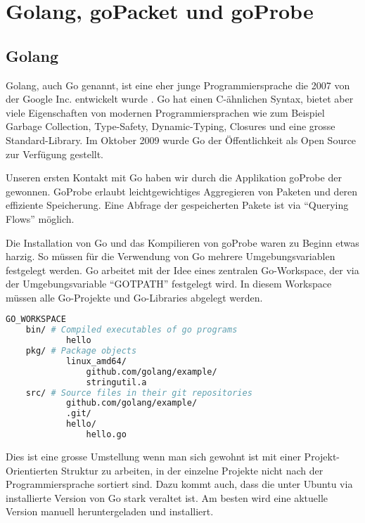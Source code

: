 \section{Golang, goPacket und goProbe}
\label{sec:Golang, goPacket und goProbe}

\subsection{Golang}
Golang, auch Go genannt, ist eine eher junge Programmiersprache die 2007 von der Google Inc. entwickelt wurde \cite[:10]{techcrunch_golang}. Go hat einen C-ähnlichen Syntax, bietet aber viele Eigenschaften von modernen Programmiersprachen wie zum Beispiel Garbage Collection, Type-Safety, Dynamic-Typing, Closures und eine grosse Standard-Library.\cite[:1-30]{effective_go}
Im Oktober 2009 wurde Go der Öffentlichkeit als Open Source zur Verfügung gestellt.

Unseren ersten Kontakt mit Go haben wir durch die Applikation goProbe der \osag{} gewonnen.
GoProbe erlaubt leichtgewichtiges Aggregieren von Paketen und deren effiziente Speicherung. Eine Abfrage der gespeicherten Pakete ist via \enquote{Querying Flows} möglich.

Die Installation von Go und das Kompilieren von goProbe waren zu Beginn etwas harzig. So müssen für die Verwendung von Go mehrere Umgebungsvariablen festgelegt werden. Go arbeitet mit der Idee eines zentralen Go-Workspace, der via der Umgebungsvariable \enquote{GOTPATH} festgelegt wird. In diesem Workspace müssen alle Go-Projekte und Go-Libraries abgelegt werden.

\begin{lstlisting}[language=bash, caption=Typische Go Workspace Struktur]
GO_WORKSPACE
	bin/ # Compiled executables of go programs
    		hello
	pkg/ # Package objects
    		linux_amd64/                     
        		github.com/golang/example/   
				stringutil.a	
	src/ # Source files in their git repositories                       
    		github.com/golang/example/       
			.git/
			hello/                       
				hello.go	
\end{lstlisting}

Dies ist eine grosse Umstellung wenn man sich gewohnt ist mit einer Projekt-Orientierten Struktur zu arbeiten, in der einzelne Projekte nicht nach der Programmiersprache sortiert sind. Dazu kommt auch, dass die unter Ubuntu via  installierte Version von Go stark veraltet ist. Am besten wird eine aktuelle Version manuell heruntergeladen und installiert.

